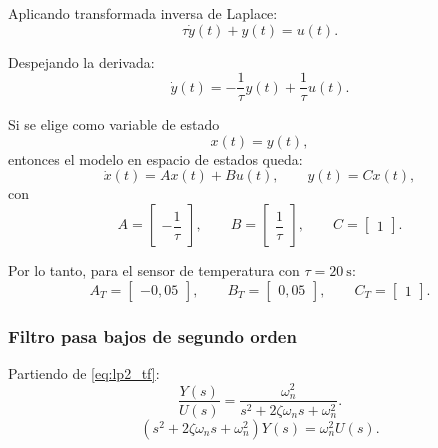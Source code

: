 \documentclass[12pt, a4paper,journal, onecolumn, compsoc]{IEEEtran}
\begin{document}
Aplicando transformada inversa de Laplace:
\begin{equation}
    \tau \dot{y}(t)+y(t)=u(t).
\end{equation}

Despejando la derivada:
\begin{equation}
    \dot{y}(t)=-\frac{1}{\tau}y(t)+\frac{1}{\tau}u(t).
\end{equation}

Si se elige como variable de estado
\begin{equation}
    x(t)=y(t),
\end{equation}
entonces el modelo en espacio de estados queda:
\begin{equation}
    \dot{x}(t)=Ax(t)+Bu(t), \qquad y(t)=Cx(t),
\end{equation}
con
\begin{equation}
    A=\begin{bmatrix}
        -\dfrac{1}{\tau}
    \end{bmatrix},
    \qquad
    B=\begin{bmatrix}
        \dfrac{1}{\tau}
    \end{bmatrix},
    \qquad
    C=\begin{bmatrix}
        1
    \end{bmatrix}.
\end{equation}

Por lo tanto, para el sensor de temperatura con $\tau=20\ \text{s}$:
\begin{equation}
    A_T=\begin{bmatrix}
        -0{,}05
    \end{bmatrix},
    \qquad
    B_T=\begin{bmatrix}
        0{,}05
    \end{bmatrix},
    \qquad
    C_T=\begin{bmatrix}
        1
    \end{bmatrix}.
\end{equation}

\subsubsection*{Filtro pasa bajos de segundo orden}

Partiendo de \eqref{eq:lp2_tf}:
\begin{equation}
    \frac{Y(s)}{U(s)}=\frac{\omega_n^2}{s^2+2\zeta\omega_n s+\omega_n^2}.
\end{equation}
\begin{equation}
    (s^2+2\zeta\omega_n s+\omega_n^2)Y(s)=\omega_n^2 U(s).
\end{equation}
\end{document}
